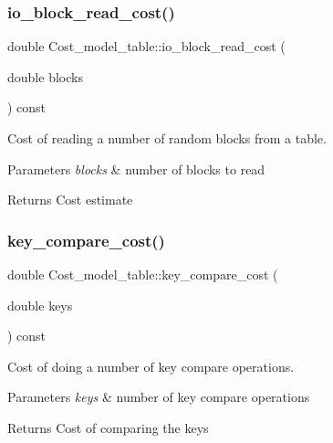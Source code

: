 \subsubsection{\texorpdfstring{io\+\_\+block\+\_\+read\+\_\+cost()}{io\_block\_read\_cost()}}
{\footnotesize\ttfamily double Cost\+\_\+model\+\_\+table\+::io\+\_\+block\+\_\+read\+\_\+cost (\begin{DoxyParamCaption}\item[{double}]{blocks }\end{DoxyParamCaption}) const\hspace{0.3cm}{\ttfamily [inline]}}

Cost of reading a number of random blocks from a table.


\begin{DoxyParams}{Parameters}
{\em blocks} & number of blocks to read\\
\hline
\end{DoxyParams}
\begin{DoxyReturn}{Returns}
Cost estimate 
\end{DoxyReturn}
\mbox{\label{classCost__model__table_af442546c88953a32e25f05a36dfa4e76}} 
\subsubsection{\texorpdfstring{key\+\_\+compare\+\_\+cost()}{key\_compare\_cost()}}
{\footnotesize\ttfamily double Cost\+\_\+model\+\_\+table\+::key\+\_\+compare\+\_\+cost (\begin{DoxyParamCaption}\item[{double}]{keys }\end{DoxyParamCaption}) const\hspace{0.3cm}{\ttfamily [inline]}}

Cost of doing a number of key compare operations.


\begin{DoxyParams}{Parameters}
{\em keys} & number of key compare operations\\
\hline
\end{DoxyParams}
\begin{DoxyReturn}{Returns}
Cost of comparing the keys 
\end{DoxyReturn}
\mbox{\label{classCost__model__table_a4105484634b87ab3736f5bfa41d8fb4d}} 
